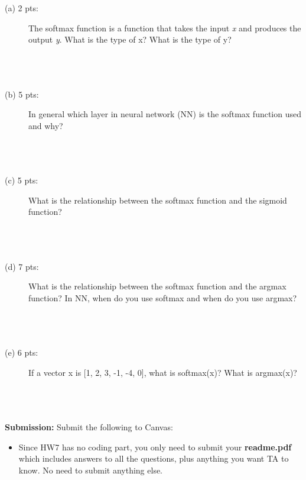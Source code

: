 \documentclass[11pt]{article}
\begin{document}
\begin{description}
\item [(a) 2 pts:] The softmax function is a function that takes the input
  {\it x} and produces the output {\it y}. What is the type of x?
  What is the type of y? \\ \\ \\ \\
  
\item [(b) 5 pts:] In general which layer in neural network (NN) is the softmax function used and why? \\ \\ \\ \\

\item [(c) 5 pts:] What is the relationship between the softmax function
  and the sigmoid function?  \\ \\ \\ \\

\item [(d) 7 pts:] What is the relationship between the softmax function
  and the argmax function? In NN, when do you use softmax and
  when do you use argmax? \\ \\ \\ \\

\item [(e) 6 pts:] If a vector x is [1, 2, 3, -1, -4, 0], what is
  softmax(x)? What is argmax(x)? \\ \\ \\ \\
  
  
\end{description}
 






\vspace{0.5 in}
\noindent
{\bf Submission:}  Submit the following to Canvas:

\begin{itemize}
\item Since HW7 has no coding part, you only need to submit your {\bf readme.pdf}
  which includes answers to all the questions, plus anything you want
  TA to know. No need to submit anything else. 
  
\end{itemize}
\end{document}
